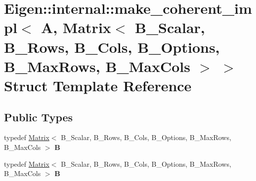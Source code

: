 \hypertarget{struct_eigen_1_1internal_1_1make__coherent__impl_3_01_a_00_01_matrix_3_01_b___scalar_00_01_b___r2332686f3180c2f2d848d1b5e8319450}{}\section{Eigen\+:\+:internal\+:\+:make\+\_\+coherent\+\_\+impl$<$ A, Matrix$<$ B\+\_\+\+Scalar, B\+\_\+\+Rows, B\+\_\+\+Cols, B\+\_\+\+Options, B\+\_\+\+Max\+Rows, B\+\_\+\+Max\+Cols $>$ $>$ Struct Template Reference}
\label{struct_eigen_1_1internal_1_1make__coherent__impl_3_01_a_00_01_matrix_3_01_b___scalar_00_01_b___r2332686f3180c2f2d848d1b5e8319450}
\subsection*{Public Types}
\begin{DoxyCompactItemize}
\item 
\mbox{\label{struct_eigen_1_1internal_1_1make__coherent__impl_3_01_a_00_01_matrix_3_01_b___scalar_00_01_b___r2332686f3180c2f2d848d1b5e8319450_a0911a904a9e79c2ae16f5f7925bf9be5}} 
typedef \hyperlink{group___core___module_class_eigen_1_1_matrix}{Matrix}$<$ B\+\_\+\+Scalar, B\+\_\+\+Rows, B\+\_\+\+Cols, B\+\_\+\+Options, B\+\_\+\+Max\+Rows, B\+\_\+\+Max\+Cols $>$ {\bfseries B}
\item 
\mbox{\label{struct_eigen_1_1internal_1_1make__coherent__impl_3_01_a_00_01_matrix_3_01_b___scalar_00_01_b___r2332686f3180c2f2d848d1b5e8319450_a0911a904a9e79c2ae16f5f7925bf9be5}} 
typedef \hyperlink{group___core___module_class_eigen_1_1_matrix}{Matrix}$<$ B\+\_\+\+Scalar, B\+\_\+\+Rows, B\+\_\+\+Cols, B\+\_\+\+Options, B\+\_\+\+Max\+Rows, B\+\_\+\+Max\+Cols $>$ {\bfseries B}
\end{DoxyCompactItemize}
